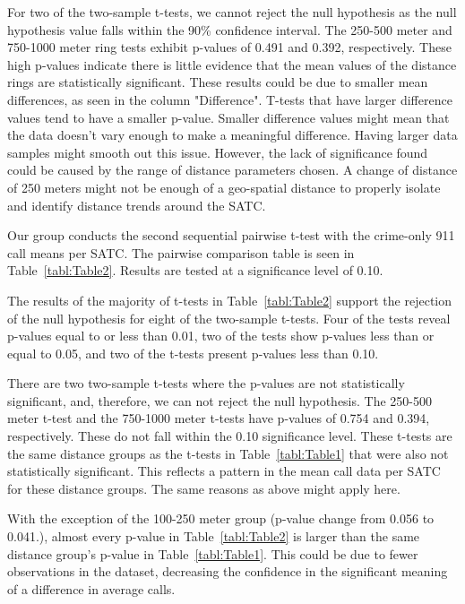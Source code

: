 \documentclass[12pt]{article}
\begin{document}
For two of the two-sample t-tests, we cannot reject the null hypothesis as the null hypothesis value falls within the 90\% confidence interval. The 250-500 meter and 750-1000 meter ring tests exhibit p-values of 0.491 and 0.392, respectively. These high p-values indicate there is little evidence that the mean values of the distance rings are statistically significant. These results could be due to smaller mean differences, as seen in the column "Difference". T-tests that have larger difference values tend to have a smaller p-value. Smaller difference values might mean that the data doesn't vary enough to make a meaningful difference. Having larger data samples might smooth out this issue. However, the lack of significance found could be caused by the range of distance parameters chosen. A change of distance of 250 meters might not be enough of a geo-spatial distance to properly isolate and identify distance trends around the SATC.

Our group conducts the second sequential pairwise t-test with the crime-only 911 call means per SATC. The pairwise comparison table is seen in Table~\ref{tabl:Table2}. Results are tested at a significance level of 0.10. 


The results of the majority of t-tests in Table~\ref{tabl:Table2} support the rejection of the null hypothesis for eight of the two-sample t-tests. Four of the tests reveal p-values equal to or less than 0.01, two of the tests show p-values less than or equal to 0.05, and two of the t-tests present p-values less than 0.10. 

There are two two-sample t-tests where the p-values are not statistically significant, and, therefore, we can not reject the null hypothesis. The 250-500 meter t-test and the 750-1000 meter t-tests have p-values of 0.754 and 0.394, respectively. These do not fall within the 0.10 significance level. These t-tests are the same distance groups as the t-tests in Table~\ref{tabl:Table1} that were also not statistically significant. This reflects a pattern in the mean call data per SATC for these distance groups. The same reasons as above might apply here.

With the exception of the 100-250 meter group (p-value change from 0.056 to 0.041.), almost every p-value in Table~\ref{tabl:Table2} is larger than the same distance group's p-value in Table~\ref{tabl:Table1}. This could be due to fewer observations in the dataset, decreasing the confidence in the significant meaning of a difference in average calls. 
\end{document}
